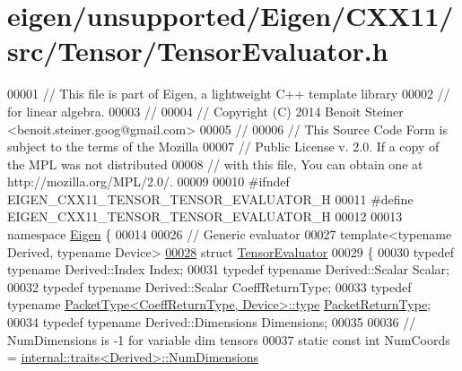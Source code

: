 \hypertarget{eigen_2unsupported_2_eigen_2_c_x_x11_2src_2_tensor_2_tensor_evaluator_8h_source}{}\section{eigen/unsupported/\+Eigen/\+C\+X\+X11/src/\+Tensor/\+Tensor\+Evaluator.h}
\label{eigen_2unsupported_2_eigen_2_c_x_x11_2src_2_tensor_2_tensor_evaluator_8h_source}

\begin{DoxyCode}
00001 \textcolor{comment}{// This file is part of Eigen, a lightweight C++ template library}
00002 \textcolor{comment}{// for linear algebra.}
00003 \textcolor{comment}{//}
00004 \textcolor{comment}{// Copyright (C) 2014 Benoit Steiner <benoit.steiner.goog@gmail.com>}
00005 \textcolor{comment}{//}
00006 \textcolor{comment}{// This Source Code Form is subject to the terms of the Mozilla}
00007 \textcolor{comment}{// Public License v. 2.0. If a copy of the MPL was not distributed}
00008 \textcolor{comment}{// with this file, You can obtain one at http://mozilla.org/MPL/2.0/.}
00009 
00010 \textcolor{preprocessor}{#ifndef EIGEN\_CXX11\_TENSOR\_TENSOR\_EVALUATOR\_H}
00011 \textcolor{preprocessor}{#define EIGEN\_CXX11\_TENSOR\_TENSOR\_EVALUATOR\_H}
00012 
00013 \textcolor{keyword}{namespace }\hyperlink{namespace_eigen}{Eigen} \{
00014 
00026 \textcolor{comment}{// Generic evaluator}
00027 \textcolor{keyword}{template}<\textcolor{keyword}{typename} Derived, \textcolor{keyword}{typename} Device>
\hyperlink{struct_eigen_1_1_tensor_evaluator}{00028} \textcolor{keyword}{struct }\hyperlink{struct_eigen_1_1_tensor_evaluator}{TensorEvaluator}
00029 \{
00030   \textcolor{keyword}{typedef} \textcolor{keyword}{typename} Derived::Index Index;
00031   \textcolor{keyword}{typedef} \textcolor{keyword}{typename} Derived::Scalar Scalar;
00032   \textcolor{keyword}{typedef} \textcolor{keyword}{typename} Derived::Scalar CoeffReturnType;
00033   \textcolor{keyword}{typedef} \textcolor{keyword}{typename} \hyperlink{group___sparse_core___module}{PacketType<CoeffReturnType, Device>::type} 
      \hyperlink{group___sparse_core___module}{PacketReturnType};
00034   \textcolor{keyword}{typedef} \textcolor{keyword}{typename} Derived::Dimensions Dimensions;
00035 
00036   \textcolor{comment}{// NumDimensions is -1 for variable dim tensors}
00037   \textcolor{keyword}{static} \textcolor{keyword}{const} \textcolor{keywordtype}{int} NumCoords = \hyperlink{struct_eigen_1_1internal_1_1traits}{internal::traits<Derived>::NumDimensions}

\end{DoxyCode}
